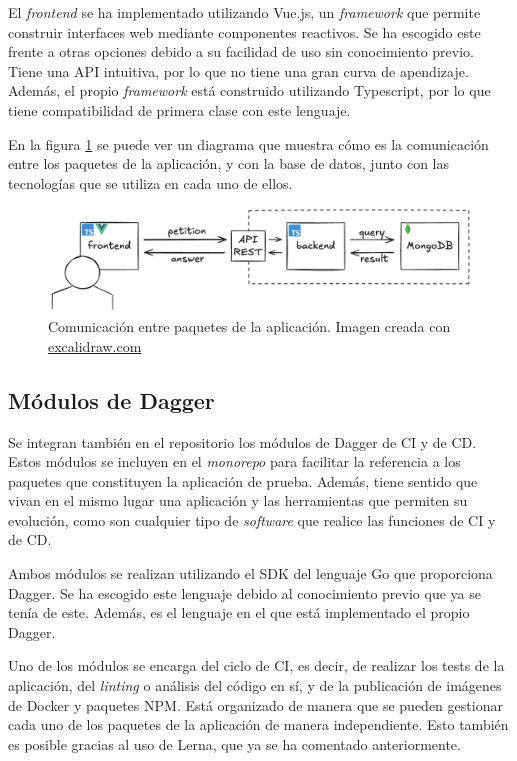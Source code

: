 El \textit{frontend} se ha implementado utilizando Vue.js\cite{vue}, un \textit{framework} que permite construir interfaces web mediante componentes reactivos. Se ha escogido este frente a otras opciones debido a su facilidad de uso sin conocimiento previo. Tiene una API intuitiva, por lo que no tiene una gran curva de apendizaje. Además, el propio \textit{framework} está construido utilizando Typescript, por lo que tiene compatibilidad de primera clase con este lenguaje.

En la figura \ref{fig:app} se puede ver un diagrama que muestra cómo es la comunicación entre los paquetes de la aplicación, y con la base de datos, junto con las tecnologías que se utiliza en cada uno de ellos.

\begin{figure}
  \centerline{\includegraphics[width=15cm]{figuras/app}}
  \caption{Comunicación entre paquetes de la aplicación. Imagen creada con \href{https://excalidraw.com}{excalidraw.com}}
  \label{fig:app}
\end{figure}

\subsection*{Módulos de Dagger}

Se integran también en el repositorio los módulos de Dagger de CI y de CD. Estos módulos se incluyen en el \textit{monorepo} para facilitar la referencia a los paquetes que constituyen la aplicación de prueba. Además, tiene sentido que vivan en el mismo lugar una aplicación y las herramientas que permiten su evolución, como son cualquier tipo de \textit{software} que realice las funciones de CI y de CD.

Ambos módulos se realizan utilizando el SDK del lenguaje Go que proporciona Dagger. Se ha escogido este lenguaje debido al conocimiento previo que ya se tenía de este. Además, es el lenguaje en el que está implementado el propio Dagger.

Uno de los módulos se encarga del ciclo de CI, es decir, de realizar los tests de la aplicación, del \textit{linting} o análisis del código en sí, y de la publicación de imágenes de Docker y paquetes NPM. Está organizado de manera que se pueden gestionar cada uno de los paquetes de la aplicación de manera independiente. Esto también es posible gracias al uso de Lerna, que ya se ha comentado anteriormente.

